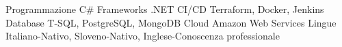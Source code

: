 

\begin{cvskills}

  \cvskill
    {Programmazione} %
    {C\# } %
  \cvskill
    {Frameworks} %
    {.NET} %
  \cvskill
    {CI/CD} %
    {Terraform, Docker, Jenkins} %
  \cvskill
    {Database} %
    {T-SQL, PostgreSQL, MongoDB} %
  \cvskill
    {Cloud} %
    {Amazon Web Services} %
  \cvskill
    {Lingue} %
    {Italiano-Nativo, Sloveno-Nativo, Inglese-Conoscenza professionale} %

\end{cvskills}
